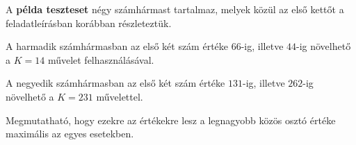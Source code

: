 \Explanation

A \textbf{példa teszteset} négy számhármast tartalmaz, melyek közül az első kettőt a feladatleírásban korábban részleteztük.

A harmadik számhármasban az első két szám értéke $66$-ig, illetve $44$-ig növelhető a $K=14$ művelet felhasználásával.

A negyedik számhármasban az első két szám értéke $131$-ig, illetve $262$-ig növelhető a $K=231$ művelettel.

Megmutatható, hogy ezekre az értékekre lesz a legnagyobb közös osztó értéke maximális az egyes esetekben.
